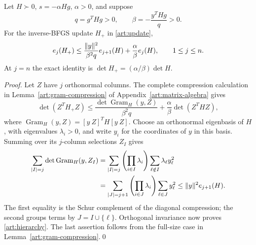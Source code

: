 \begin{theorem}\label{art:minor-hierarchy}
Let $H\succ0$, $s=-\alpha Hg$, $\alpha>0$, and suppose
\[
 q=g^THg>0,\qquad \beta=-\frac{y^THg}{q}>0.
\]
For the inverse-BFGS update $H_+$ in \eqref{art:update},
\begin{equation}\label{art:hierarchy}
 e_j(H_+)\le\frac{\lVert y\rVert^2}{\beta^2q}e_{j+1}(H)
                   +\frac\alpha\beta e_j(H),\qquad 1\le j\le n.
\end{equation}
At $j=n$ the exact identity is $\det H_+=(\alpha/\beta)\det H$.
\end{theorem}
\begin{proof}
Let $Z$ have $j$ orthonormal columns. The complete compression calculation in
Lemma~\ref{art:gram-compression} of Appendix~\ref{art:matrix-algebra} gives
\[
 \det(Z^TH_+Z)\le
 \frac{\det\operatorname{Gram}_H(y,Z)}{\beta^2q}
       +\frac\alpha\beta\det(Z^THZ),
\]
where $\operatorname{Gram}_H(y,Z)=[y\ Z]^TH[y\ Z]$.
Choose an orthonormal eigenbasis of $H$, with eigenvalues $\lambda_i>0$, and
write $y_i$ for the coordinates of $y$ in this basis. Summing over its
$j$-column selections $Z_I$ gives
\begin{align*}
 \sum_{|I|=j}\det\operatorname{Gram}_H(y,Z_I)
 &=\sum_{|I|=j}\left(\prod_{i\in I}\lambda_i\right)
                  \sum_{\ell\notin I}\lambda_\ell y_\ell^2\\
 &=\sum_{|J|=j+1}\left(\prod_{i\in J}\lambda_i\right)
                  \sum_{\ell\in J}y_\ell^2
 \le\lVert y\rVert^2e_{j+1}(H).
\end{align*}
The first equality is the Schur complement of the diagonal compression;
the second groups terms by $J=I\cup\{\ell\}$. Orthogonal invariance now
proves \eqref{art:hierarchy}. The last assertion follows from the full-size
case in Lemma~\ref{art:gram-compression}.\qed
\end{proof}

